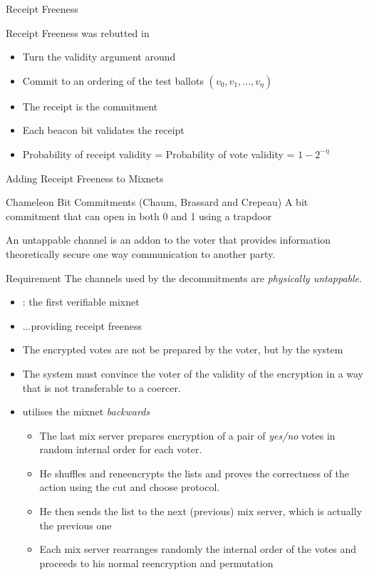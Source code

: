 \documentclass{beamer}
\begin{document}
\begin{frame}[allowframebreaks]{Receipt Freeness \cite{BT94}}
\framebreak

\cite{BT94} Receipt Freeness was rebutted in \cite{HS00}
\begin{itemize}
\item Turn the validity argument around
\item Commit to an ordering of the test ballots $(v_0,v_1,...,v_\eta)$
\item The receipt is the commitment
\item Each beacon bit validates the receipt
\item Probability of receipt validity = Probability of vote validity = $1-2^{-\eta}$
\end{itemize}

\end{frame}

\begin{frame}[allowframebreaks]{Adding Receipt Freeness to Mixnets \cite{SK95}}

\begin{definition}{Chameleon Bit Commitments (Chaum, Brassard and Crepeau)}
A bit commitment that can open in both 0 and 1 using a trapdoor
\end{definition}

\begin{definition}
An untappable channel is an addon to the voter that provides information theoretically secure one way communication to another party. 
\end{definition}

\begin{block}{Requirement}
The channels used by the decommitments are \textit{physically untappable}.
\end{block}

\begin{itemize}
\item \cite{SK95}: the first verifiable mixnet
\item ...providing receipt freeness
\item The encrypted votes are not be prepared by the voter, but by the system
\item The system must convince the voter of the validity of the encryption in a way that is not transferable to a coercer.
 

\item \cite{SK95} utilises the mixnet \textit{backwards}
\begin{itemize}
\item The last mix server prepares encryption of  a pair of \textit{yes/no} votes in random internal order for each voter.
\item He shuffles and reneencrypts the lists and proves the correctness of the action using the cut and choose protocol.
\item He then sends the list to the next (previous) mix server, which is actually the previous one
\item Each mix server rearranges randomly the internal order of the votes and proceeds to his normal reencryption and permutation
\end{itemize}


\end{itemize}
\end{frame}
\end{document}
